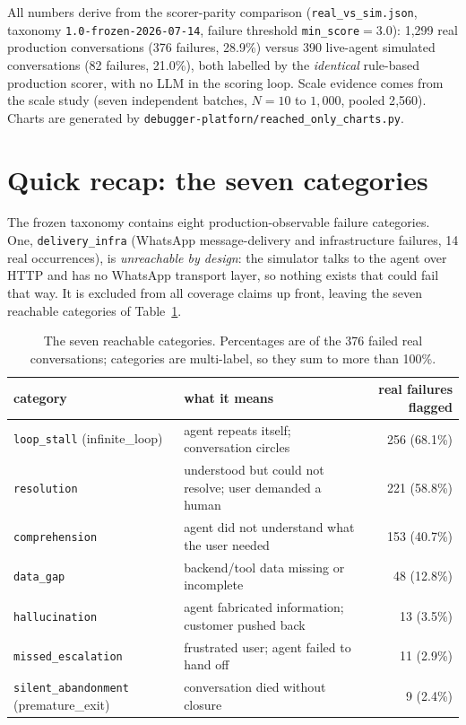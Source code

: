 \documentclass[11pt,a4paper]{article}
\newcommand{\cat}[1]{\texttt{#1}}
\begin{document}
\noindent
All numbers derive from the scorer-parity comparison
(\texttt{real\_vs\_sim.json}, taxonomy \texttt{1.0-frozen-2026-07-14}, failure threshold
\texttt{min\_score}${}=3.0$): 1{,}299 real production conversations (376 failures, 28.9\%) versus
390 live-agent simulated conversations (82 failures, 21.0\%), both labelled by the
\emph{identical} rule-based production scorer, with no LLM in the scoring loop. Scale evidence
comes from the scale study (seven independent batches, $N=10$ to $1{,}000$, pooled 2{,}560).
Charts are generated by \texttt{debugger-platforn/reached\_only\_charts.py}.

\section{Quick recap: the seven categories}

The frozen taxonomy contains eight production-observable failure categories. One,
\cat{delivery\_infra} (WhatsApp message-delivery and infrastructure failures, 14 real
occurrences), is \emph{unreachable by design}: the simulator talks to the agent over HTTP and has
no WhatsApp transport layer, so nothing exists that could fail that way. It is excluded from all
coverage claims up front, leaving the seven reachable categories of Table~\ref{tab:seven}.

\begin{table}[H]
\centering
\small
\begin{tabular}{llr}
\toprule
category & what it means & real failures flagged \\
\midrule
\cat{loop\_stall} (infinite\_loop) & agent repeats itself; conversation circles & 256 (68.1\%) \\
\cat{resolution} & understood but could not resolve; user demanded a human & 221 (58.8\%) \\
\cat{comprehension} & agent did not understand what the user needed & 153 (40.7\%) \\
\cat{data\_gap} & backend/tool data missing or incomplete & 48 (12.8\%) \\
\cat{hallucination} & agent fabricated information; customer pushed back & 13 (3.5\%) \\
\cat{missed\_escalation} & frustrated user; agent failed to hand off & 11 (2.9\%) \\
\cat{silent\_abandonment} (premature\_exit) & conversation died without closure & 9 (2.4\%) \\
\bottomrule
\end{tabular}
\caption{The seven reachable categories. Percentages are of the 376 failed real conversations;
categories are multi-label, so they sum to more than 100\%.}
\label{tab:seven}
\end{table}
\end{document}
